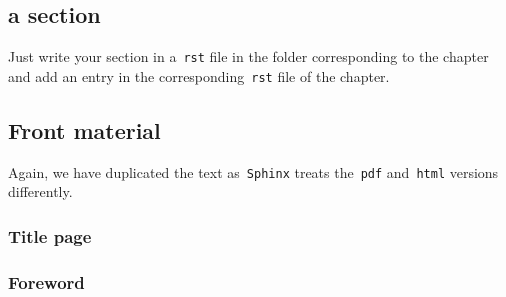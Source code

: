 \documentclass[a4paper,10pt]{article}
\newcommand{\code}[1]{\texttt{#1}}
\begin{document}
\subsection{a section}

Just write your section in a~\code{rst} file in the folder corresponding to the chapter and add an entry in the corresponding~\code{rst} file of the chapter.

% 
% 
% 
% 
% 
% 
% 
% 
% 
% 
% 
% 

\subsection{Front material}

Again, we have duplicated the text as~\code{Sphinx} treats the~\code{pdf} and~\code{html} versions differently.

\subsubsection{Title page}

\subsubsection{Foreword}
\end{document}

